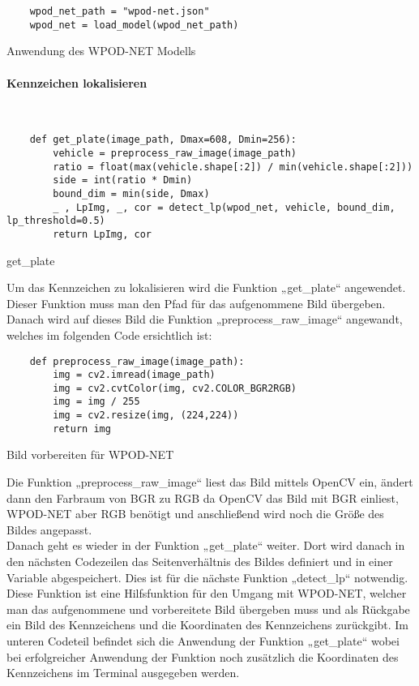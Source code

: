 \begin{listing}[H]
    \begin{verbatim}
    wpod_net_path = "wpod-net.json"
    wpod_net = load_model(wpod_net_path)
    \end{verbatim}
    \caption{Anwendung des WPOD-NET Modells}
\end{listing}

\paragraph{Kennzeichen lokalisieren}\mbox{}\\

\begin{listing}[H]
    \begin{verbatim}
    def get_plate(image_path, Dmax=608, Dmin=256):
        vehicle = preprocess_raw_image(image_path)
        ratio = float(max(vehicle.shape[:2]) / min(vehicle.shape[:2]))
        side = int(ratio * Dmin)
        bound_dim = min(side, Dmax)
        _ , LpImg, _, cor = detect_lp(wpod_net, vehicle, bound_dim, lp_threshold=0.5)
        return LpImg, cor
    \end{verbatim}
    \caption{get{\_}plate}
\end{listing}

Um das Kennzeichen zu lokalisieren wird die Funktion „get{\_}plate“ angewendet. Dieser Funktion muss man den Pfad für das aufgenommene 
Bild übergeben. Danach wird auf dieses Bild die Funktion „preprocess{\_}raw{\_}image“ angewandt, welches im folgenden Code ersichtlich ist:

\begin{listing}[H]
    \begin{verbatim}
    def preprocess_raw_image(image_path):
        img = cv2.imread(image_path)
        img = cv2.cvtColor(img, cv2.COLOR_BGR2RGB)
        img = img / 255
        img = cv2.resize(img, (224,224))
        return img
    \end{verbatim}
    \caption{Bild vorbereiten für WPOD-NET}
\end{listing}

Die Funktion „preprocess{\_}raw{\_}image“ liest das Bild mittels OpenCV ein, ändert dann den Farbraum von BGR zu RGB da OpenCV das Bild mit 
BGR einliest, WPOD-NET aber RGB benötigt und anschließend wird noch die Größe des Bildes angepasst.\\

Danach geht es wieder in der Funktion „get{\_}plate“ weiter. Dort wird danach in den nächsten Codezeilen das Seitenverhältnis des Bildes 
definiert und in einer Variable abgespeichert. Dies ist für die nächste Funktion „detect{\_}lp“ notwendig. Diese Funktion ist eine Hilfsfunktion 
für den Umgang mit WPOD-NET, welcher man das aufgenommene und vorbereitete Bild übergeben muss und als Rückgabe ein Bild des Kennzeichens und 
die Koordinaten des Kennzeichens zurückgibt. Im unteren Codeteil befindet sich die Anwendung der Funktion „get{\_}plate“ wobei bei erfolgreicher 
Anwendung der Funktion noch zusätzlich die Koordinaten des Kennzeichens im Terminal ausgegeben werden.

